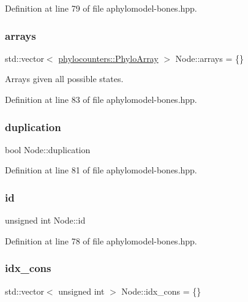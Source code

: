 Definition at line 79 of file aphylomodel-\/bones.\+hpp.

\mbox{\label{class_node_a269d78db10090d106c697d7c73bac9c7}} 
\subsubsection{\texorpdfstring{arrays}{arrays}}
{\footnotesize\ttfamily std\+::vector$<$ \hyperlink{namespacebarry_1_1counters_1_1phylo_abd293bf65e494e903639fb5fb2c91604}{phylocounters\+::\+Phylo\+Array} $>$ Node\+::arrays = \{\}}



Arrays given all possible states. 



Definition at line 83 of file aphylomodel-\/bones.\+hpp.

\mbox{\label{class_node_a3129939e8a58c055cb5ad8db8be6b10a}} 
\subsubsection{\texorpdfstring{duplication}{duplication}}
{\footnotesize\ttfamily bool Node\+::duplication}



Definition at line 81 of file aphylomodel-\/bones.\+hpp.

\mbox{\label{class_node_adb90577d9d796c4ccbccf41ce2efc6c9}} 
\subsubsection{\texorpdfstring{id}{id}}
{\footnotesize\ttfamily unsigned int Node\+::id}



Definition at line 78 of file aphylomodel-\/bones.\+hpp.

\mbox{\label{class_node_a95fa1b71d6c1a8cf155520c6d974d540}} 
\subsubsection{\texorpdfstring{idx\+\_\+cons}{idx\_cons}}
{\footnotesize\ttfamily std\+::vector$<$ unsigned int $>$ Node\+::idx\+\_\+cons = \{\}}



